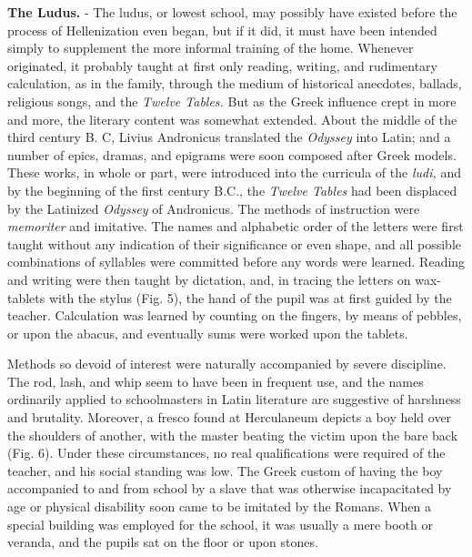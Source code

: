 \documentclass[]{book}
\begin{document}
\textbf{The Ludus.} - The ludus, or lowest school, may possibly have existed before the process of Hellenization even began, but if it did, it must have been intended simply to supplement the more informal training of the home. Whenever originated, it probably taught at first only reading, writing, and rudimentary calculation, as in the family, through the medium of historical anecdotes, ballads, religious songs, and the \emph{Twelve Tables.} But as the Greek influence crept in more and more, the literary content was somewhat extended. About the middle of the third century B. C, Livius Andronicus translated the \emph{Odyssey} into Latin; and a number of epics, dramas, and epigrams were soon composed after Greek models. These works, in whole or part, were introduced into the curricula of the \emph{ludi,} and by the beginning of the first century B.C., the \emph{Twelve Tables} had been displaced by the Latinized \emph{Odyssey} of Andronicus. The methods of instruction were \emph{memoriter} and imitative. The names and alphabetic order of the letters were first taught without any indication of their significance or even shape, and all possible combinations of syllables were committed before any words were learned. Reading and writing were then taught by dictation, and, in tracing the letters on wax-tablets with the stylus (Fig. 5), the hand of the pupil was at first guided by the teacher. Calculation was learned by counting on the fingers, by means of pebbles, or upon the abacus, and eventually sums were worked upon the tablets.

Methods so devoid of interest were naturally accompanied by severe discipline. The rod, lash, and whip seem to have been in frequent use, and the names ordinarily applied to schoolmasters in Latin literature are suggestive of harshness and brutality. Moreover, a fresco found at Herculaneum depicts a boy held over the shoulders of another, with the master beating the victim upon the bare back (Fig. 6). Under these circumstances, no real qualifications were required of the teacher, and his social standing was low. The Greek custom of having the boy accompanied to and from school by a slave that was otherwise incapacitated by age or physical disability soon came to be imitated by the Romans. When a special building was employed for the school, it was usually a mere booth or veranda, and the pupils sat on the floor or upon stones.
\end{document}
